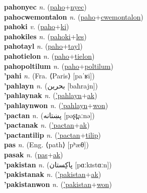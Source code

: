 \textbf{pahonyec} \textit{n.} (\hyperref[paho]{paho}+\hyperref[nyec]{nyec})
 \label{pahonyec} \\
\textbf{pahocwemontalon} \textit{n.} (\hyperref[paho]{paho}+\hyperref[cwemontalon]{cwemontalon})
 \label{pahocwemontalon} \\
\textbf{pahoki} \textit{v.} (\hyperref[paho]{paho}+\hyperref[ki]{ki})
 \label{pahoki} \\
\textbf{pahokiles} \textit{n.} (\hyperref[pahoki]{pahoki}+\hyperref[les]{les})
 \label{pahokiles} \\
\textbf{pahotayl} \textit{n.} (\hyperref[paho]{paho}+\hyperref[tayl]{tayl})
 \label{pahotayl} \\
\textbf{pahotielon} \textit{n.} (\hyperref[paho]{paho}+\hyperref[tielon]{tielon})
 \label{pahotielon} \\
\textbf{pahopoltilum} \textit{n.} (\hyperref[paho]{paho}+\hyperref[poltilum]{poltilum})
 \label{pahopoltilum} \\
\textbf{'pahi} \textit{n.} (Fra. ⟨Paris⟩ [paˈʁi])
 \label{'pahi} \\
\textbf{'pahlayn} \textit{n.} ({\arabics{}بحرين‎} [baħrajn])
 \label{'pahlayn} \\
\textbf{'pahlaynak} \textit{n.} (\hyperref['pahlayn]{'pahlayn}+\hyperref[ak]{ak})
 \label{'pahlaynak} \\
\textbf{'pahlaynwon} \textit{n.} (\hyperref['pahlayn]{'pahlayn}+\hyperref[won]{won})
 \label{'pahlaynwon} \\
\textbf{'pactan} \textit{n.} ({\arabics{}پښتانه‎‎} [pəʂt̪aːnə])
 \label{'pactan} \\
\textbf{'pactanak} \textit{n.} (\hyperref['pactan]{'pactan}+\hyperref[ak]{ak})
 \label{'pactanak} \\
\textbf{'pactantilip} \textit{n.} (\hyperref['pactan]{'pactan}+\hyperref[tilip]{tilip})
 \label{'pactantilip} \\
\textbf{pas} \textit{n.} (Eng. ⟨path⟩ [pʰæθ])
 \label{pas} \\
\textbf{pasak} \textit{n.} (\hyperref[pas]{pas}+\hyperref[ak]{ak})
 \label{pasak} \\
\textbf{'pakistan} \textit{n.} ({\gurmukhi{}پاکِستان‎} [pɑːkɪstɑːn])
 \label{'pakistan} \\
\textbf{'pakistanak} \textit{n.} (\hyperref['pakistan]{'pakistan}+\hyperref[ak]{ak})
 \label{'pakistanak} \\
\textbf{'pakistanwon} \textit{n.} (\hyperref['pakistan]{'pakistan}+\hyperref[won]{won})
 \label{'pakistanwon} \\
